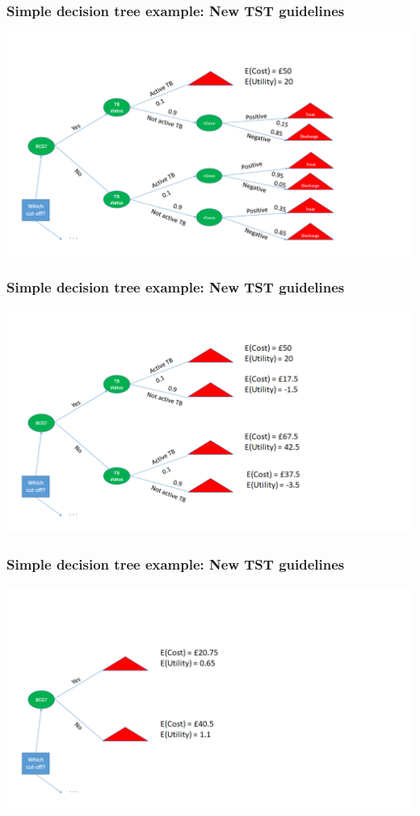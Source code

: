 \begin{frame}
\frametitle{Simple decision tree example: New TST guidelines}
 \includegraphics[width=\textwidth,height=0.8\textheight, keepaspectratio]{decision-trees/figs/folding-back2}
\end{frame}

\begin{frame}
\frametitle{Simple decision tree example: New TST guidelines}
 \includegraphics[width=\textwidth,height=0.8\textheight, keepaspectratio]{decision-trees/figs/folding-back3}
\end{frame}

\begin{frame}
\frametitle{Simple decision tree example: New TST guidelines}
 \includegraphics[width=\textwidth,height=0.8\textheight, keepaspectratio]{decision-trees/figs/folding-back4}
\end{frame}



